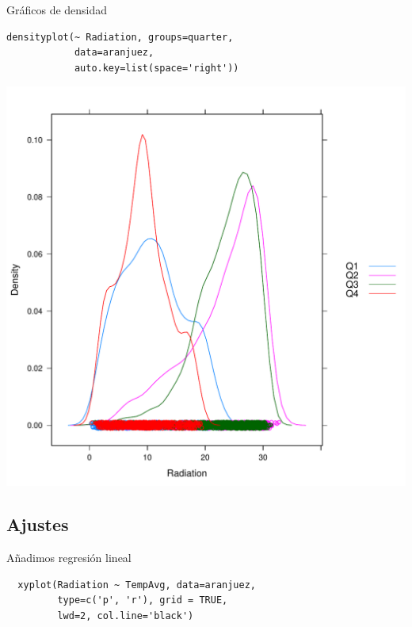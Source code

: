 \documentclass[xcolor={usenames,svgnames,dvipsnames}]{beamer}
\begin{document}
\begin{frame}[fragile,label=sec-6-1-16]{Gráficos de densidad}
 \lstset{language=R,label= ,caption= ,numbers=none}
\begin{lstlisting}
densityplot(~ Radiation, groups=quarter,
            data=aranjuez,
            auto.key=list(space='right'))
\end{lstlisting}
\end{frame}

\begin{frame}[label=sec-6-1-17]{}
\includegraphics[width=.9\linewidth]{figs/density.pdf}
\end{frame}



\subsection{Ajustes}
\label{sec-6-2}
\begin{frame}[fragile,label=sec-6-2-1]{Añadimos regresión lineal}
 \lstset{language=R,label= ,caption= ,numbers=none}
\begin{lstlisting}
  xyplot(Radiation ~ TempAvg, data=aranjuez,
         type=c('p', 'r'), grid = TRUE,
         lwd=2, col.line='black')
\end{lstlisting}
\end{frame}
\end{document}
